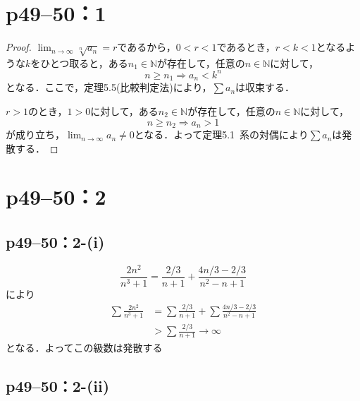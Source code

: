 \documentclass[a4paper,10pt,fleqn]{ltjsarticle}
\begin{document}
\section*{p49--50：1}

\begin{tleftbar}
    \begin{proof}
        $\lim_{n \to \infty} \sqrt[n]{a_n} =r$であるから，$0<r<1$であるとき，$r<k<1$となるような$k$をひとつ取ると，ある$n_1 \in \mathbb{N}$が存在して，任意の$n \in \mathbb{N}$に対して，
        \[
            n \ge n_1 \Longrightarrow a_n<k^n
        \]
        となる．ここで，定理5.5(比較判定法)により，$\sum a_n$は収束する．

        $r>1$のとき，$1>0$に対して，ある$n_2 \in \mathbb{N}$が存在して，任意の$n \in \mathbb{N}$に対して，
        \[
            n \ge n_2 \Longrightarrow a_n >1
        \]
        が成り立ち，$\lim_{n \to \infty} a_n \ne 0$となる．よって定理5.1~系の対偶により$\sum a_n$は発散する．
    \end{proof}
\end{tleftbar}


\section*{p49--50：2}


\subsection*{p49--50：2-(i)}

\begin{screen}
    \[
        \frac{2n^2}{n^3+1}=\frac{2/3}{n+1}+\frac{4n/3-2/3}{n^2-n+1}
    \]
    により
    \begin{align*}
        \sum \frac{2n^2}{n^3+1} & =\sum \frac{2/3}{n+1}+\sum \frac{4n/3-2/3}{n^2-n+1} \\
                                & >\sum \frac{2/3}{n+1} \rightarrow \infty
    \end{align*}
    となる．よってこの級数は発散する
\end{screen}


\subsection*{p49--50：2-(ii)}
\end{document}
